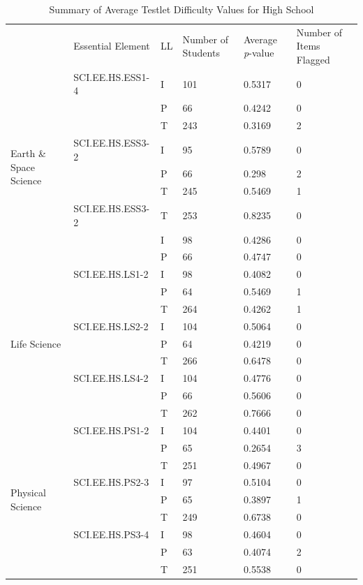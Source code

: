 \documentclass[11.5pt]{sig-alternate} %
\begin{document}
\clearpage

\begin{table}[t]
\caption*{Summary of Average Testlet Difficulty Values for High School}
\begin{tabular}{|l|l|l|l|l|l|}
\hline
& Essential Element & LL & Number of Students & Average \textit{p}-value & Number of Items Flagged \\ \cline{2-6}
\multirow{9}{*}{Earth \& Space Science} & SCI.EE.HS.ESS1-4 & I & 101 & 0.5317 & 0 \\ \cline{2-6}
 & & P & 66 & 0.4242 & 0 \\ \cline{2-6}
 & & T & 243 & 0.3169 & 2 \\ \cline{2-6}
 & SCI.EE.HS.ESS3-2 & I & 95 & 0.5789 & 0 \\ \cline{2-6}
 & & \cellcolor{yellow}P & \cellcolor{yellow}66 & \cellcolor{yellow}0.298 & \cellcolor{yellow}2 \\ \cline{2-6}
 & & T & 245 & 0.5469 & 1 \\ \cline{2-6}
 & SCI.EE.HS.ESS3-2 & T & 253 & 0.8235 & 0 \\ \cline{2-6}
 & & I & 98 & 0.4286 & 0 \\ \cline{2-6}
 & & P & 66 & 0.4747 & 0 \\ \hline
\multirow{9}{*}{Life Science} & SCI.EE.HS.LS1-2 & I & 98 & 0.4082 & 0 \\ \cline{2-6}
 & & P & 64 & 0.5469 & 1 \\ \cline{2-6}
 & & T & 264 & 0.4262 & 1 \\ \cline{2-6}
 & SCI.EE.HS.LS2-2 & I & 104 & 0.5064 & 0 \\ \cline{2-6}
 & & P & 64 & 0.4219 & 0 \\ \cline{2-6}
 & & T & 266 & 0.6478 & 0 \\ \cline{2-6}
 & SCI.EE.HS.LS4-2 & I & 104 & 0.4776 & 0 \\ \cline{2-6}
 & & P & 66 & 0.5606 & 0 \\ \cline{2-6}
 & & T & 262 & 0.7666 & 0 \\ \hline
\multirow{9}{*}{Physical Science} & SCI.EE.HS.PS1-2 & I & 104 & 0.4401 & 0 \\ \cline{2-6}
 & & \cellcolor{yellow}P & \cellcolor{yellow}65 & \cellcolor{yellow}0.2654 & \cellcolor{yellow}3 \\ \cline{2-6}
 & & T & 251 & 0.4967 & 0 \\ \cline{2-6}
 & SCI.EE.HS.PS2-3 & I & 97 & 0.5104 & 0 \\ \cline{2-6}
 & & P & 65 & 0.3897 & 1 \\ \cline{2-6}
 & & T & 249 & 0.6738 & 0 \\ \cline{2-6}
 & SCI.EE.HS.PS3-4 & I & 98 & 0.4604 & 0 \\ \cline{2-6}
 & & P & 63 & 0.4074 & 2 \\ \cline{2-6}
 & & T & 251 & 0.5538 & 0 \\ \hline
\end{tabular}
\end{table}
\end{document}
